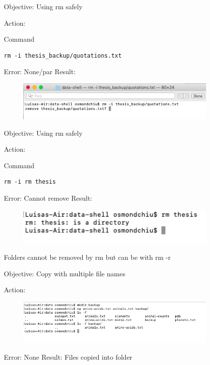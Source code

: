 \documentclass{article}
\begin{document}
Objective: Using rm safely\par
Action:\par
Command\begin{verbatim}rm -i thesis_backup/quotations.txt\end{verbatim}\par
Error: None/par
Result:

\begin{figure}[htp]
    \centering
    \includegraphics[width=10cm]{Screenshot4.png}
    \label{fig:ls-4}
\end{figure}

Objective: Using rm safely\label{sec: rm}\par 
Action:\par
Command\begin{verbatim}rm -i rm thesis\end{verbatim}\par
Error: Cannot remove 
Result:

\begin{figure}[htp]
    \centering
    \includegraphics[width=10cm]{Screenshot5.png}
    \label{fig:ls-5}
\end{figure}

Folders cannot be removed by rm but can be with rm -r\par

Objective: Copy with multiple file names\par
Action:\par
\begin{figure}[htp]
    \centering
    \includegraphics[width=10cm]{Screenshot6.png}
    \label{fig:ls-6}
\end{figure}
Error: None
Result: Files copied into folder\par
\end{document}
